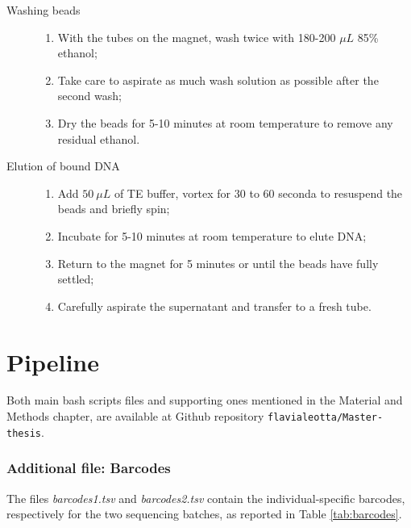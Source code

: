 \documentclass[a4paper, 12pt]{report}
\begin{document}
\begin{description}
	\item[Washing beads]\begin{enumerate}\setlength\itemsep{-0.2em}
		\item With the tubes on the magnet, wash twice with 180-200 $\mu L$ 85\% ethanol;
		\item Take care to aspirate as much wash solution as possible after the second wash;
		\item Dry the beads for 5-10 minutes at room temperature to remove any residual ethanol.
	\end{enumerate}
	\item[Elution of bound DNA]\begin{enumerate}\setlength\itemsep{-0.2em}
		\item Add $50 \ \mu L$ of TE buffer, vortex for 30 to 60 seconda to resuspend the beads and briefly spin;
		\item Incubate for 5-10 minutes at room temperature to elute DNA;
		\item Return to the magnet for 5 minutes or until the beads have fully settled;
		\item Carefully aspirate the supernatant and transfer to a fresh tube.
	\end{enumerate}
\end{description}
\vspace{-1.5em}

\newpage
\section{Pipeline}\label{sec:pipelines}
\vspace{-1em}
Both main bash scripts files and supporting ones mentioned in the Material and Methods chapter, are available at Github repository \texttt{flavialeotta/Master-thesis}.
\vspace{-2em}
\subsubsection{Additional file: Barcodes}\label{subsec:barcodes}
\vspace{-1em}
The files \textit{barcodes1.tsv} and  \textit{barcodes2.tsv} contain the individual-specific barcodes, respectively for the two sequencing batches, as reported in Table \ref{tab:barcodes}.
\end{document}
